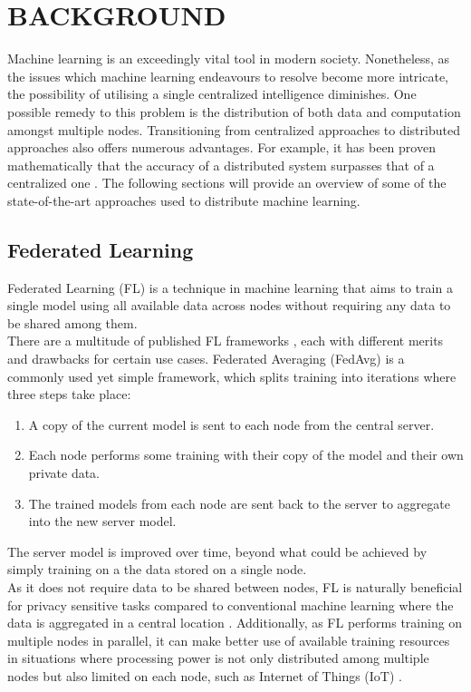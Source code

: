 \documentclass[letterpaper, 10 pt, conference]{ieeeconf}  %
\begin{document}
\section{BACKGROUND}

Machine learning is an exceedingly vital tool in modern society. Nonetheless, as the issues which machine learning endeavours to resolve become more intricate, the possibility of utilising a single centralized intelligence diminishes. One possible remedy to this problem is the distribution of both data and computation amongst multiple nodes. Transitioning from centralized approaches to distributed approaches also offers numerous advantages. For example, it has been proven mathematically that the accuracy of a distributed system surpasses that of a centralized one \cite{swarmbetterthanone}. The following sections will provide an overview of some of the state-of-the-art approaches used to distribute machine learning.


\subsection{Federated Learning}
Federated Learning (FL) \cite{survey_on_fed_learning} is a technique in machine learning that aims to train a single model using all available data across nodes without requiring any data to be shared among them. \\

There are a multitude of published FL frameworks \cite{fed_table_survey}, each with different merits and drawbacks for certain use cases. Federated Averaging (FedAvg) \cite{fed_learning} is a commonly used yet simple framework, which splits training into iterations where three steps take place:
\begin{enumerate}
	\item A copy of the current model is sent to each node from the central server.
	\item Each node performs some training with their copy of the model and their own private data.
	\item The trained models from each node are sent back to the server to aggregate into the new server model.
\end{enumerate}
The server model is improved over time, beyond what could be achieved by simply training on a the data stored on a single node. \\

As it does not require data to be shared between nodes, FL is naturally beneficial for privacy sensitive tasks compared to conventional machine learning where the data is aggregated in a central location \cite{fed_privacy}. Additionally, as FL performs training on multiple nodes in parallel, it can make better use of available training resources in situations where processing power is not only distributed among multiple nodes but also limited on each node, such as Internet of Things (IoT) \cite{fed_iot_2}.
\end{document}
